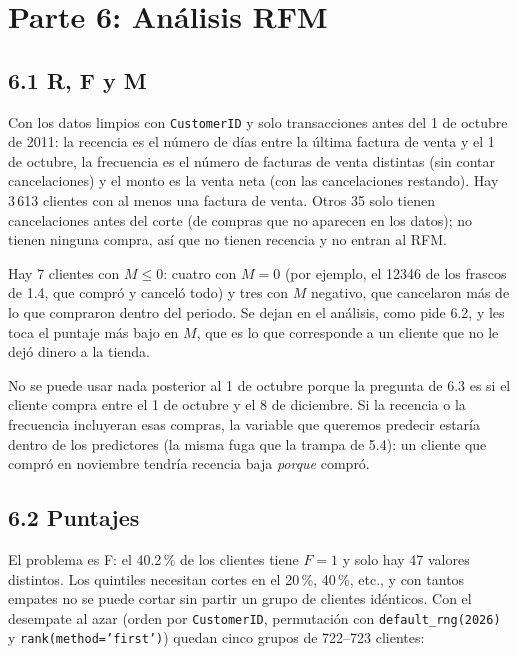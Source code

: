 \documentclass[11pt]{article}
\newcommand{\tabla}[1]{}
\begin{document}
\section{Parte 6: Análisis RFM}

\subsection*{6.1 R, F y M}
Con los datos limpios con \texttt{CustomerID} y solo transacciones antes del 1 de octubre de 2011: la recencia es el número de días entre la última factura de venta y el 1 de octubre, la frecuencia es el número de facturas de venta distintas (sin contar cancelaciones) y el monto es la venta neta (con las cancelaciones restando). Hay 3\,613 clientes con al menos una factura de venta. Otros 35 solo tienen cancelaciones antes del corte (de compras que no aparecen en los datos); no tienen ninguna compra, así que no tienen recencia y no entran al RFM.

Hay 7 clientes con $M\le0$: cuatro con $M=0$ (por ejemplo, el 12346 de los frascos de 1.4, que compró y canceló todo) y tres con $M$ negativo, que cancelaron más de lo que compraron dentro del periodo. Se dejan en el análisis, como pide 6.2, y les toca el puntaje más bajo en $M$, que es lo que corresponde a un cliente que no le dejó dinero a la tienda.

No se puede usar nada posterior al 1 de octubre porque la pregunta de 6.3 es si el cliente compra entre el 1 de octubre y el 8 de diciembre. Si la recencia o la frecuencia incluyeran esas compras, la variable que queremos predecir estaría dentro de los predictores (la misma fuga que la trampa de 5.4): un cliente que compró en noviembre tendría recencia baja \emph{porque} compró.

\subsection*{6.2 Puntajes}
El problema es F: el 40.2\,\% de los clientes tiene $F=1$ y solo hay 47 valores distintos. Los quintiles necesitan cortes en el 20\,\%, 40\,\%, etc., y con tantos empates no se puede cortar sin partir un grupo de clientes idénticos. Con el desempate al azar (orden por \texttt{CustomerID}, permutación con \texttt{default\_rng(2026)} y \texttt{rank(method='first')}) quedan cinco grupos de 722--723 clientes:

\begin{table}[H]\centering\small
\caption{Rango de F dentro de cada puntaje.}
\tabla{p6_rangos_f}
\end{table}
\end{document}
